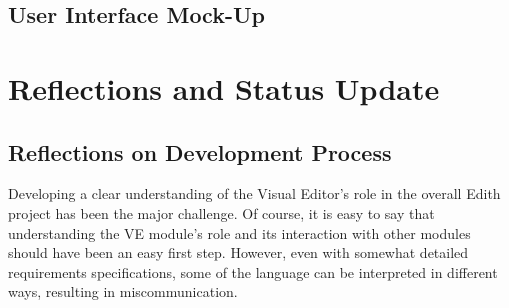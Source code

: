 \documentclass{llncs}
\begin{document}
\subsection{User Interface Mock-Up}
\noindent{}

\clearpage

\section{Reflections and Status Update}

\subsection{Reflections on Development Process}
Developing a clear understanding of the Visual Editor’s role in the overall Edith project has been the major challenge.   Of course, it is easy to say that understanding the VE module’s role and its interaction with other modules should have been an easy first step.  However, even with somewhat detailed requirements specifications, some of the language can be interpreted in different ways, resulting in miscommunication.  
\end{document}
